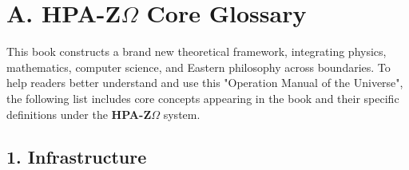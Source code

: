 \section*{A. HPA-Z$\Omega$ Core Glossary}

This book constructs a brand new theoretical framework, integrating physics, mathematics, computer science, and Eastern philosophy across boundaries. To help readers better understand and use this "Operation Manual of the Universe", the following list includes core concepts appearing in the book and their specific definitions under the \textbf{HPA-Z$\Omega$} system.

\subsection*{1. Infrastructure}

